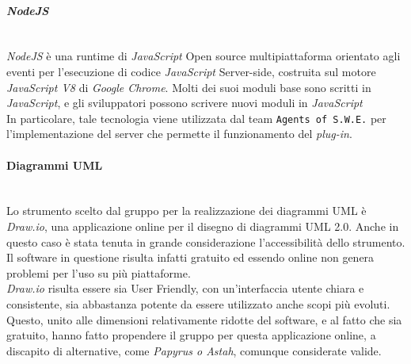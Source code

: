 \paragraph{\textit{NodeJS}} \label{node}\-\\
\textit{NodeJS} è una runtime di \textit{JavaScript} Open source multipiattaforma orientato agli eventi per l'esecuzione di codice \textit{JavaScript} Server-side, costruita sul motore \textit{JavaScript V8} di \textit{Google Chrome}. Molti dei suoi moduli base sono scritti in \textit{JavaScript}, e gli sviluppatori possono scrivere nuovi moduli in \textit{JavaScript}\\
In particolare, tale tecnologia viene utilizzata dal team \texttt{Agents of S.W.E.} per l'implementazione del server che permette il funzionamento del \textit{plug-in}.

\paragraph{Diagrammi UML} \-\\
Lo strumento scelto dal gruppo per la realizzazione dei diagrammi UML è \textit{Draw.io}, una applicazione online per il disegno di diagrammi UML 2.0. Anche in questo caso è stata tenuta in grande considerazione l'accessibilità dello strumento. Il software in questione risulta infatti gratuito ed essendo online non genera problemi per l'uso su più piattaforme.\\
\textit{Draw.io} risulta essere sia User Friendly, con un'interfaccia utente chiara e consistente, sia abbastanza potente da essere utilizzato anche scopi più evoluti. Questo, unito alle dimensioni relativamente ridotte del software, e al fatto che sia gratuito, hanno fatto propendere il gruppo per questa applicazione online, a discapito di alternative, come \textit{Papyrus o Astah}, comunque considerate valide.

